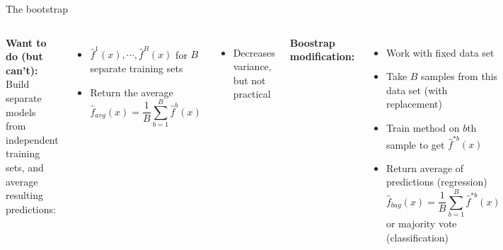 \documentclass[aspectratio=169,usenames,dvipsnames]{beamer}
\newcommand{\InstructorList}[1]{
\begin{itemize}
	\color{orange}
	#1
\end{itemize}
}
\begin{document}
\begin{frame}[t]{The bootstrap}

\begin{columns}

\textbf{Want to do (but can't):} \\
Build separate models from independent training sets, and average resulting predictions:
\begin{itemize}
	\item $\hat f^1(x), \cdots, \hat f^B(x)$ for $B$ separate training sets
	\item Return the average
	\begin{equation*}
		\hat f_{avg}(x) = \frac{1}{B} \sum_{b=1}^B \hat f^b(x)
	\end{equation*}

\end{itemize}
\InstructorList{
  \item Decreases variance, but not practical
}


\textbf{Boostrap modification:}
\begin{itemize}
	\item Work with fixed data set
	\item Take $B$ samples from this data set (with replacement)
	\item Train method on $b$th sample to get $\hat f^{*b}(x)$
	\item Return average of predictions (regression)
	\begin{equation*}
		\hat f_{bag}(x) = \frac{1}{B} \sum_{b=1}^B \hat f^{*b}(x)
	\end{equation*}
	or majority vote (classification)
\end{itemize}



\end{columns}

\end{frame}
\end{document}
